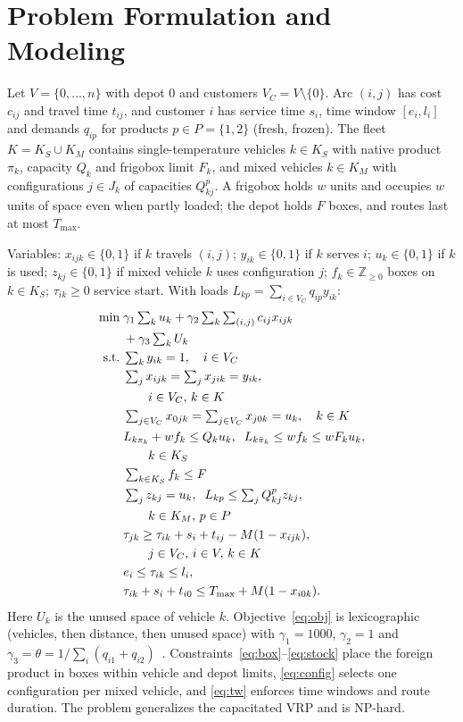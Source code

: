 \documentclass[conference]{IEEEtran}
\begin{document}
\section{Problem Formulation and Modeling}
Let $V=\{0,\dots,n\}$ with depot $0$ and customers $V_C=V\setminus\{0\}$. Arc $(i,j)$ has cost $c_{ij}$ and travel time $t_{ij}$, and customer $i$ has service time $s_i$, time window $[e_i,l_i]$ and demands $q_{ip}$ for products $p\in P=\{1,2\}$ (fresh, frozen). The fleet $K=K_S\cup K_M$ contains single-temperature vehicles $k\in K_S$ with native product $\pi_k$, capacity $Q_k$ and frigobox limit $F_k$, and mixed vehicles $k\in K_M$ with configurations $j\in J_k$ of capacities $Q^p_{kj}$. A frigobox holds $w$ units and occupies $w$ units of space even when partly loaded; the depot holds $F$ boxes, and routes last at most $T_{\max}$.

Variables: $x_{ijk}\in\{0,1\}$ if $k$ travels $(i,j)$; $y_{ik}\in\{0,1\}$ if $k$ serves $i$; $u_k\in\{0,1\}$ if $k$ is used; $z_{kj}\in\{0,1\}$ if mixed vehicle $k$ uses configuration $j$; $f_k\in\mathbb{Z}_{\ge 0}$ boxes on $k\in K_S$; $\tau_{ik}\ge 0$ service start. With loads $L_{kp}=\sum_{i\in V_C} q_{ip}y_{ik}$:
\begin{align}
\min\;& \gamma_1\textstyle\sum_{k} u_k+\gamma_2\sum_{k}\sum_{(i,j)} c_{ij}x_{ijk} \notag\\
& +\gamma_3\textstyle\sum_{k}U_k \label{eq:obj}\\
\text{s.t.}\;& \textstyle\sum_{k} y_{ik}=1,\quad i\in V_C \label{eq:assign}\\
& \textstyle\sum_{j} x_{ijk}=\sum_{j} x_{jik}=y_{ik},\notag\\
& \qquad i\in V_C,\,k\in K\\
& \textstyle\sum_{j\in V_C} x_{0jk}=\sum_{j\in V_C} x_{j0k}=u_k,\quad k\in K\\
& L_{k\pi_k}+w f_k\le Q_k u_k,\;\; L_{k\bar\pi_k}\le w f_k\le wF_k u_k,\notag\\
& \qquad k\in K_S \label{eq:box}\\
& \textstyle\sum_{k\in K_S} f_k\le F \label{eq:stock}\\
& \textstyle\sum_{j} z_{kj}=u_k,\;\; L_{kp}\le\sum_{j} Q^p_{kj}z_{kj},\notag\\
& \qquad k\in K_M,\,p\in P \label{eq:config}\\
& \tau_{jk}\ge\tau_{ik}+s_i+t_{ij}-M(1-x_{ijk}),\notag\\
& \qquad j\in V_C,\,i\in V,\,k\in K\\
& e_i\le\tau_{ik}\le l_i,\notag\\
& \tau_{ik}+s_i+t_{i0}\le T_{\max}+M(1-x_{i0k}). \label{eq:tw}
\end{align}
Here $U_k$ is the unused space of vehicle $k$. Objective~\eqref{eq:obj} is lexicographic (vehicles, then distance, then unused space) with $\gamma_1=1000$, $\gamma_2=1$ and $\gamma_3=\theta=1/\sum_{i}(q_{i1}+q_{i2})$~\cite{masmoudi2026}. Constraints~\eqref{eq:box}--\eqref{eq:stock} place the foreign product in boxes within vehicle and depot limits, \eqref{eq:config} selects one configuration per mixed vehicle, and \eqref{eq:tw} enforces time windows and route duration. The problem generalizes the capacitated VRP and is NP-hard.
\end{document}

